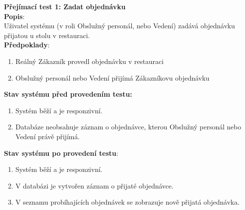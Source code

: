 {\large\textbf{Přejímací test 1: Zadat objednávku}} \\

\textbf{Popis}: \\\indent Uživatel systému (v roli Obslužný personál, nebo Vedení) zadává objednávku přijatou u stolu v restauraci. \\

\textbf{Předpoklady}: 
\begin{enumerate}
	\item Reálný Zákazník provedl objednávku v restauraci
	\item Obslužný personál nebo Vedení přijímá Zákazníkovu objednávku
\end{enumerate}

\textbf{Stav systému před provedením testu:}
\begin{enumerate}
	\item Systém běží a je responzivní.
	\item Databáze neobsahuje záznam o objednávce, kterou Obslužný personál nebo Vedení právě přijímá. 
\end{enumerate}

\textbf{Stav systému po provedení testu}:
\begin{enumerate}
	\item Systém běží a je responzivní.
	\item V databázi je vytvořen záznam o přijaté objednávce.
	\item V seznamu probíhajících objednávek se zobrazuje nově přijatá objednávka.
\end{enumerate}

